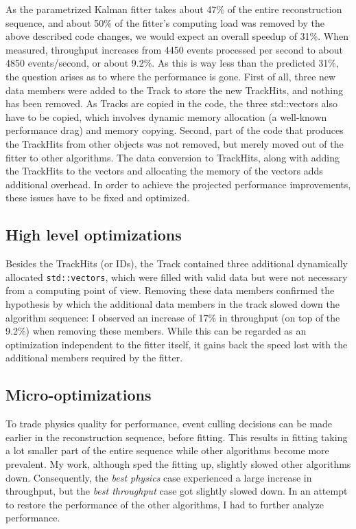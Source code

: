 \documentclass[12pt]{article}
\newcommand{\code}[1]{\texttt{#1}}
\begin{document}
As the parametrized Kalman fitter takes about 47\% of the entire reconstruction sequence, and about 50\% of the fitter's computing load was removed by the above described code changes, we would expect an overall speedup of 31\%. When measured, throughput increases from 4450 events processed per second to about 4850 events/second, or about 9.2\%. As this is way less than the predicted 31\%, the question arises as to where the performance is gone. First of all, three new data members were added to the Track to store the new TrackHits, and nothing has been removed. As Tracks are copied in the code, the three std::vectors also have to be copied, which involves dynamic memory allocation (a well-known performance drag) and memory copying. Second, part of the code that produces the TrackHits from other objects was not removed, but merely moved out of the fitter to other algorithms. The data conversion to TrackHits, along with adding the TrackHits to the vectors and allocating the memory of the vectors adds additional overhead. In order to achieve the projected performance improvements, these issues have to be fixed and optimized.


\subsection{High level optimizations}

Besides the TrackHits (or IDs), the Track contained three additional dynamically allocated \code{std::vectors}, which were filled with valid data but were not necessary from a computing point of view. Removing these data members confirmed the hypothesis by which the additional data members in the track slowed down the algorithm sequence: I observed an increase of 17\% in throughput (on top of the 9.2\%) when removing these members. While this can be regarded as an optimization independent to the fitter itself, it gains back the speed lost with the additional members required by the fitter.


\subsection{Micro-optimizations}

To trade physics quality for performance, event culling decisions can be made earlier in the reconstruction sequence, before fitting. This results in fitting taking a lot smaller part of the entire sequence while other algorithms become more prevalent. My work, although sped the fitting up, slightly slowed other algorithms down. Consequently, the \textit{best physics} case experienced a large increase in throughput, but the \textit{best throughput} case got slightly slowed down. In an attempt to restore the performance of the other algorithms, I had to further analyze performance.
\end{document}

